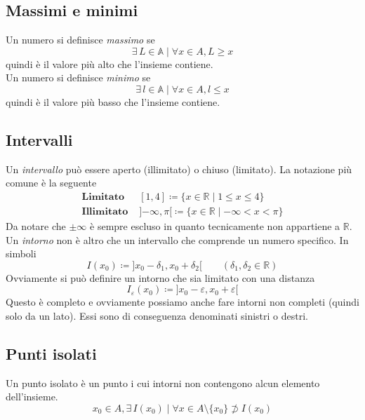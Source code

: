 \subsection{Massimi e minimi}
Un numero si definisce \emph{massimo} se
\begin{equation*}
\exists\,L\in\mathbb{A}\mid\forall x\in A, L\geq x
\end{equation*}
quindi è il valore più alto che l'insieme contiene.\\
Un numero si definisce \emph{minimo} se
\begin{equation*}
\exists\,l\in\mathbb{A}\mid\forall x\in A, l\leq x
\end{equation*}
quindi è il valore più basso che l'insieme contiene.

\subsection{Intervalli}
Un \emph{intervallo} può essere aperto (illimitato) o chiuso (limitato). La notazione più comune è la 
seguente
\begin{align*}
\textbf{Limitato }&{[{1},{4}]}\coloneqq\{x\in\mathbb{R}\mid1\leq x \leq4\}\\
\textbf{Illimitato }&{]{-\infty},{\pi}[}\coloneq\{x\in\mathbb{R}\mid-\infty<x<\pi\}
\end{align*}
Da notare che $\pm\infty$ è sempre escluso in quanto tecnicamente non appartiene a $\mathbb{R}$.\\
Un \emph{intorno} non è altro che un intervallo che comprende un numero specifico. In simboli
\begin{equation*}
I(x_0)\coloneqq{]{x_0-\delta_1},{x_0+\delta_2}[} \qquad(\delta_1,\delta_2\in\mathbb{R})
\end{equation*}
Ovviamente si può definire un intorno che sia limitato con una distanza
\begin{equation*}
I_\varepsilon(x_0)\coloneqq{]{x_0-\varepsilon},{x_0+\varepsilon}[} 
\end{equation*}
Questo è completo e ovviamente possiamo anche fare intorni non completi (quindi solo da un lato). Essi 
sono di conseguenza denominati sinistri o destri.

\subsection{Punti isolati}
Un punto isolato è un punto i cui intorni non contengono alcun elemento dell'insieme.
\begin{equation*}
x_0\in A, \exists\,I(x_0)\mid\forall x\in A\setminus\{x_0\}\not\supset I(x_0)
\end{equation*}

